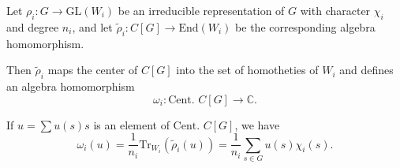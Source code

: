 Let $\rho_i: G \to \text{GL}(W_i)$ be an irreducible representation of $G$ with character $\chi_i$ and degree $n_i$, and let $\tilde{\rho}_i: C[G] \to \text{End}(W_i)$ be the corresponding algebra homomorphism.

Then $\tilde{\rho}_i$ maps the center of $C[G]$ into the set of homotheties of $W_i$ and defines an algebra homomorphism
$$\omega_i: \text{Cent. } C[G] \to \mathbb{C}.$$

If $u = \sum u(s)s$ is an element of $\text{Cent. } C[G]$, we have
$$\omega_i(u) = \frac{1}{n_i} \text{Tr}_{W_i}(\tilde{\rho}_i(u)) = \frac{1}{n_i} \sum_{s \in G} u(s)\chi_i(s).$$
